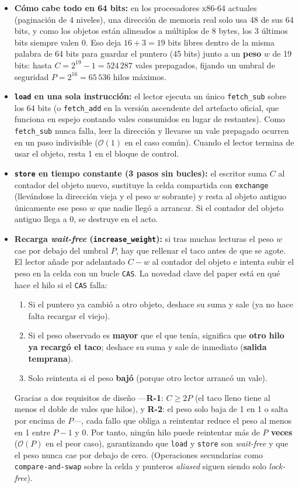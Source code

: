 \documentclass[11pt,a4paper]{article}
\begin{document}
\begin{itemize}
  \item \textbf{Cómo cabe todo en 64 bits:} en los procesadores x86-64 actuales (paginación de 4 niveles), una dirección de memoria real solo usa 48 de sus 64 bits, y como los objetos están alineados a múltiplos de 8 bytes, los 3 últimos bits siempre valen 0. Eso deja $16 + 3 = 19$ bits libres dentro de la misma palabra de 64 bits para guardar el puntero (45 bits) junto a un \textbf{peso} $w$ de 19 bits: hasta $C = 2^{19} - 1 = 524\,287$ vales prepagados, fijando un umbral de seguridad $P = 2^{16} = 65\,536$ hilos máximos.
  \item \textbf{\texttt{load} en una sola instrucción:} el lector ejecuta un único \texttt{fetch\_sub} sobre los 64 bits (o \texttt{fetch\_add} en la versión ascendente del artefacto oficial, que funciona en espejo contando vales consumidos en lugar de restantes). Como \texttt{fetch\_sub} nunca falla, leer la dirección y llevarse un vale prepagado ocurren en un paso indivisible ($\mathcal{O}(1)$ en el caso común). Cuando el lector termina de usar el objeto, resta 1 en el bloque de control.
  \item \textbf{\texttt{store} en tiempo constante (3 pasos sin bucles):} el escritor suma $C$ al contador del objeto nuevo, sustituye la celda compartida con \texttt{exchange} (llevándose la dirección vieja y el peso $w$ sobrante) y resta al objeto antiguo únicamente ese peso $w$ que nadie llegó a arrancar. Si el contador del objeto antiguo llega a 0, se destruye en el acto.
  \item \textbf{Recarga \emph{wait-free} (\texttt{increase\_weight}):} si tras muchas lecturas el peso $w$ cae por debajo del umbral $P$, hay que rellenar el taco antes de que se agote. El lector añade por adelantado $C - w$ al contador del objeto e intenta subir el peso en la celda con un bucle \texttt{CAS}. La novedad clave del paper está en qué hace el hilo si el \texttt{CAS} falla:
  \begin{enumerate}
    \item Si el puntero ya cambió a otro objeto, deshace su suma y sale (ya no hace falta recargar el viejo).
    \item Si el peso observado es \textbf{mayor} que el que tenía, significa que \textbf{otro hilo ya recargó el taco}; deshace su suma y sale de inmediato (\textbf{salida temprana}).
    \item Solo reintenta si el peso \textbf{bajó} (porque otro lector arrancó un vale).
  \end{enumerate}
  Gracias a dos requisitos de diseño —\textbf{R-1}: $C \ge 2P$ (el taco lleno tiene al menos el doble de vales que hilos), y \textbf{R-2}: el peso solo baja de 1 en 1 o salta por encima de $P$—, cada fallo que obliga a reintentar reduce el peso al menos en 1 entre $P-1$ y $0$. Por tanto, ningún hilo puede reintentar más de \textbf{$P$ veces} ($\mathcal{O}(P)$ en el peor caso), garantizando que \texttt{load} y \texttt{store} son \emph{wait-free} y que el peso nunca cae por debajo de cero. (Operaciones secundarias como \texttt{compare-and-swap} sobre la celda y punteros \emph{aliased} siguen siendo solo \emph{lock-free}).
\end{itemize}
\end{document}
